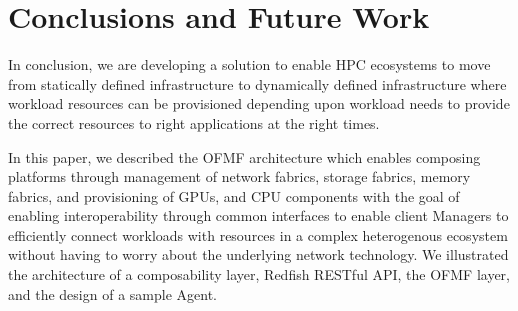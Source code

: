 \section{Conclusions and Future Work}


In conclusion, we are developing a solution to enable HPC ecosystems to move from statically defined infrastructure to dynamically defined infrastructure where workload resources can be provisioned depending upon workload needs to provide the correct resources to right applications at the right times.

In this paper, we described the OFMF architecture which enables composing platforms through management of network fabrics, storage fabrics, memory fabrics, and provisioning of GPUs, and CPU components with the goal of enabling interoperability through common interfaces to enable client Managers to efficiently connect workloads with resources in a complex heterogenous ecosystem without having to worry about the underlying network technology.  We illustrated the architecture of a composability layer, Redfish RESTful API, the OFMF layer, and the design of a sample Agent. 

